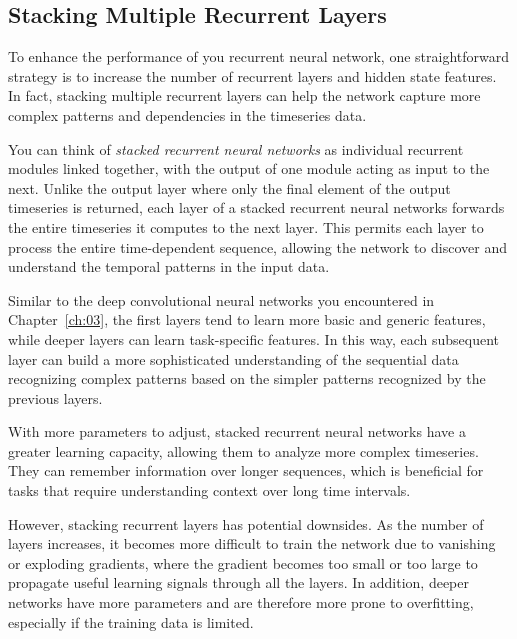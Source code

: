 \subsection{Stacking Multiple Recurrent Layers}

To enhance the performance of you recurrent neural network, one straightforward strategy is to increase the number of recurrent layers and hidden state features. In fact, stacking multiple recurrent layers can help the network capture more complex patterns and dependencies in the timeseries data.

You can think of \emph{stacked recurrent neural networks} as individual recurrent modules linked together, with the output of one module acting as input to the next. Unlike the output layer where only the final element of the output timeseries is returned, each layer of a stacked recurrent neural networks forwards the entire timeseries it computes to the next layer. This permits each layer to process the entire time-dependent sequence, allowing the network to discover and understand the temporal patterns in the input data.

Similar to the deep convolutional neural networks you encountered in Chapter~\ref{ch:03}, the first layers tend to learn more basic and generic features, while deeper layers can learn task-specific features. In this way, each subsequent layer can build a more sophisticated understanding of the sequential data recognizing complex patterns based on the simpler patterns recognized by the previous layers.

With more parameters to adjust, stacked recurrent neural networks have a greater learning capacity, allowing them to analyze more complex timeseries.  They can remember information over longer sequences, which is beneficial for tasks that require understanding context over long time intervals.

However, stacking recurrent layers has potential downsides.
As the number of layers increases, it becomes more difficult to train the network due to vanishing or exploding gradients, where the gradient becomes too small or too large to propagate useful learning signals through all the layers.
In addition, deeper networks have more parameters and are therefore more prone to overfitting, especially if the training data is limited.

